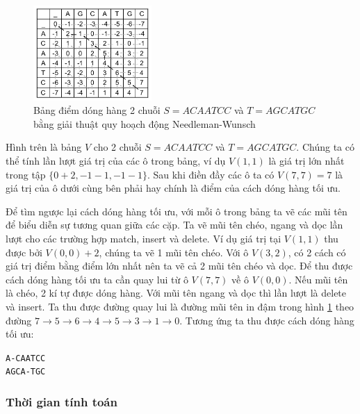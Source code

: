 \begin{figure}[H] %
    \centering %
    \includegraphics[width=0.4\textwidth]{./assets/dp.png} 
    \caption{Bảng điểm dóng hàng 2 chuỗi $S = ACAATCC$ và $T = AGCATGC$
    bằng giải thuật quy hoạch động Needleman-Wunsch} %
    \label{fig:dp_track}
\end{figure}

Hình trên là bảng $V$ cho 2 chuỗi $S = ACAATCC$ và $T = AGCATGC$.
Chúng ta có thể tính lần lượt giá trị của các ô trong bảng, ví dụ $V(1, 1)$ là giá trị 
lớn nhất trong tập $\{0+2, -1-1, -1-1\}$. Sau khi điền đầy các ô ta có $V(7,7) = 7$ là 
giá trị của ô dưới cùng bên phải hay chính là điểm của cách dóng hàng tối ưu.

Để tìm ngược lại cách dóng hàng tối ưu, với mỗi ô trong bảng ta vẽ các mũi tên để biểu 
diễn sự tương quan giữa các cặp. Ta vẽ mũi tên chéo, ngang và dọc lần lượt cho các trường
hợp match, insert và delete. Ví dụ giá trị tại $V(1,1)$ thu được bởi $V(0,0) + 2$, chúng 
ta vẽ 1 mũi tên chéo. Với ô $V(3,2)$, có 2 cách có giá trị điểm bằng điểm lớn nhất nên 
ta vẽ cả 2 mũi tên chéo và dọc. Để thu được cách dóng hàng tối ưu ta cần quay lui từ ô 
$V(7,7)$ về ô $V(0,0)$. Nếu mũi tên là chéo, 2 kí tự được dóng hàng. Với mũi tên ngang và
dọc thì lần lượt là delete và insert. Ta thu được đường quay lui là đường mũi tên in đậm 
trong hình \ref{fig:dp_track} theo đường $7 \to 5 \to 6 \to 4 \to 5 \to 3 \to 1 \to 0$.
Tương ứng ta thu được cách dóng hàng tối ưu:

\begin{center}
    \lstinline{A-CAATCC} \\
    \lstinline{AGCA-TGC}
\end{center}

\subsubsection{Thời gian tính toán}
